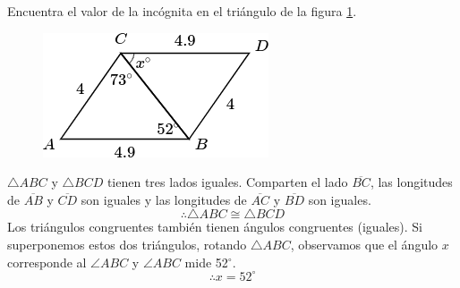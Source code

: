 Encuentra el valor de la incógnita en el triángulo de la figura \ref{fig:angle_triangle_06}.

\begin{minipage}[t][5cm][b]{0.3\textwidth}
    \begin{figure}[H]
        \centering
        \includegraphics[width=0.99\linewidth]{../images/angle_triangle_06.png}
        \caption{}
        \label{fig:angle_triangle_06}
    \end{figure}
\end{minipage}\hfill
\begin{minipage}[t]{0.65\textwidth}
    \begin{solutionbox}{5cm}
        $\triangle ABC$ y $\triangle BCD$ tienen tres lados iguales. Comparten el lado
        $\overline{BC}$, las longitudes de $\overline{AB}$ y $\overline{CD}$ son iguales y las longitudes de
        $\overline{AC}$ y $\overline{BD}$ son iguales.
        \[\therefore \triangle ABC \cong \triangle BCD\]
        Los triángulos congruentes también tienen ángulos congruentes (iguales). Si superponemos estos dos triángulos, rotando
        $\triangle ABC$, observamos que el ángulo $x$ corresponde al
        $\angle ABC$ y $\angle ABC$ mide
        52$^\circ$.
        \[\therefore x=52^\circ\]
    \end{solutionbox}
\end{minipage}

